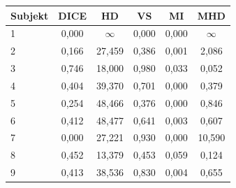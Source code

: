 \begin{tabular}{l c c c c c}
 \hline
Subjekt & DICE & HD & VS & MI & MHD \\ \hline
1 & 0,000 & $\infty$ & 0,000 & 0,000 & $\infty$ \\
2 & 0,166 & 27,459 & 0,386 & 0,001 & 2,086 \\
3 & 0,746 & 18,000 & 0,980 & 0,033 & 0,052 \\
4 & 0,404 & 39,370 & 0,701 & 0,000 & 0,379 \\
5 & 0,254 & 48,466 & 0,376 & 0,000 & 0,846 \\
6 & 0,412 & 48,477 & 0,641 & 0,003 & 0,607 \\
7 & 0,000 & 27,221 & 0,930 & 0,000 & 10,590 \\
8 & 0,452 & 13,379 & 0,453 & 0,059 & 0,124 \\
9 & 0,413 & 38,536 & 0,830 & 0,004 & 0,655 \\
\hline 
 \end{tabular}
